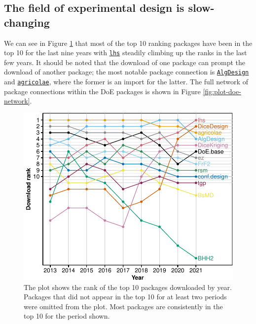 \documentclass{article}
\begin{document}
\hypertarget{the-field-of-experimental-design-is-slow-changing}{%
\subsection{The field of experimental design is
slow-changing}\label{the-field-of-experimental-design-is-slow-changing}}

We can see in Figure \ref{fig:rank-over-time} that most of the top 10
ranking packages have been in the top 10 for the last nine years with
\href{https://cran.r-project.org/web/packages/lhs/index.html}{\texttt{lhs}}
steadily climbing up the ranks in the last few years. It should be noted
that the download of one package can prompt the download of another
package; the most notable package connection is
\href{https://cran.r-project.org/web/packages/AlgDesign/index.html}{\texttt{AlgDesign}}
and
\href{https://cran.r-project.org/web/packages/agricolae/index.html}{\texttt{agricolae}},
where the former is an import for the latter. The full network of
package connections within the DoE packages is shown in Figure
\ref{fig:plot-doe-network}.

\begin{figure}[htbp]

{\centering \includegraphics{figures/rank-over-time-1} 

}

\caption{The plot shows the rank of the top 10 packages downloaded by year. Packages that did not appear in the top 10 for at least two periods were omitted from the plot. Most packages are consistently in the top 10 for the period shown.}\label{fig:rank-over-time}
\end{figure}
\end{document}
